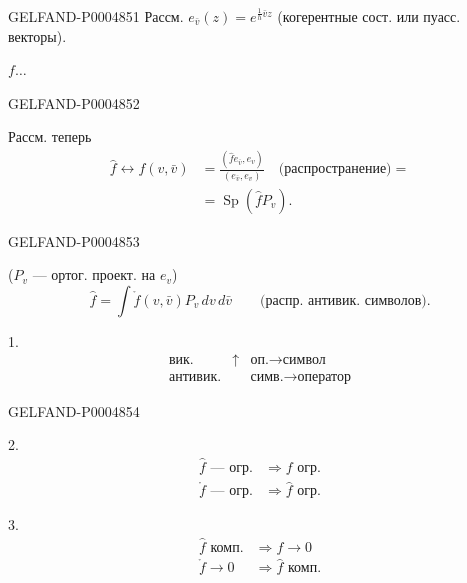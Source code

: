 \begin{GelfandAdjacentEvidence}{GELFAND-P000485}{1}
Рассм. $e_{\bar v}(z)=e^{\frac1h\bar v z}$ (когерентные сост. или пуасс. векторы).

\sout{\mbox{$f\ldots$}}
\end{GelfandAdjacentEvidence}
\begin{GelfandAdjacentEvidence}{GELFAND-P000485}{2}


Рассм. теперь
\[
\begin{aligned}
\hat f\longleftrightarrow f(v,\bar v)
&=\frac{(\hat f e_{\bar v},e_v)}{(e_{\bar v},e_v)}
\quad\text{(распространение)}={}\\
&=\operatorname{Sp}(\hat fP_v).
\end{aligned}
\]
\end{GelfandAdjacentEvidence}
\begin{GelfandAdjacentEvidence}{GELFAND-P000485}{3}


($P_v$ — ортог. проект. на $e_v$)
\[
\hat f=\int\mathring f(v,\bar v)P_v\,dv\,d\bar v
\qquad\text{(распр. антивик. символов).}
\]


1.
\[
\begin{array}{llll}
\text{вик.} & \uparrow & \text{оп.}\longrightarrow\text{символ}\\
\text{антивик.} && \text{симв.}\longrightarrow\text{оператор}
\end{array}
\]
\end{GelfandAdjacentEvidence}
\begin{GelfandAdjacentEvidence}{GELFAND-P000485}{4}


2.
\[
\begin{aligned}
\hat f\text{ — огр.}&\Longrightarrow f\text{ огр.}\\
\mathring f\text{ — огр.}&\Longrightarrow\hat f\text{ огр.}
\end{aligned}
\]

3.
\[
\begin{aligned}
\hat f\text{ комп.}&\Longrightarrow f\to0\\
\mathring f\to0&\Longrightarrow\hat f\text{ комп.}
\end{aligned}
\]
\end{GelfandAdjacentEvidence}
